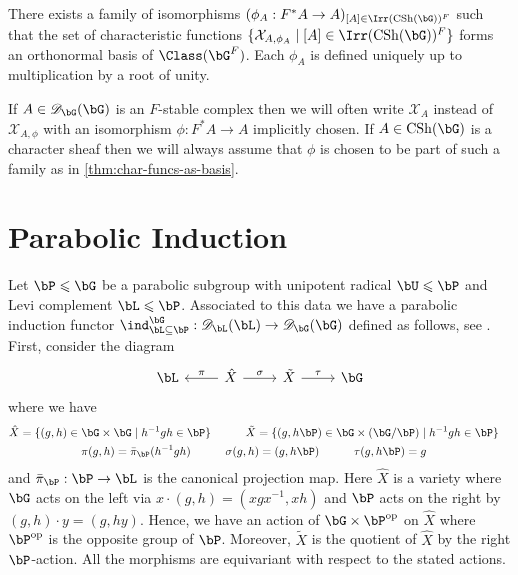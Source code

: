 \documentclass[eqthmnum,nocolour,skinny]{jt-calcs}
\DeclareMathOperator{\CS}{CSh}
\begin{document}
\begin{thm}[Lusztig]\label{thm:char-funcs-as-basis}
There exists a family of isomorphisms $(\phi_A : F^*A \to A)_{[A] \in \Irr(\CS(\bG))^F}$ such that the set of characteristic functions $\{\mathcal{X}_{A,\phi_A} \mid [A] \in \Irr(\CS(\bG))^F\}$ forms an orthonormal basis of $\Class(\bG^F)$. Each $\phi_A$ is defined uniquely up to multiplication by a root of unity.
\end{thm}

\begin{rem}
If $A \in \mathscr{D}_{\bG}(\bG)$ is an $F$-stable complex then we will often write $\mathcal{X}_A$ instead of $\mathcal{X}_{A,\phi}$ with an isomorphism $\phi : F^*A \to A$ implicitly chosen. If $A \in \CS(\bG)$ is a character sheaf then we will always assume that $\phi$ is chosen to be part of such a family as in \cref{thm:char-funcs-as-basis}.
\end{rem}

\section{Parabolic Induction}\label{sec:parabolic-ind-char-sheaves}
\begin{pa}\label{pa:ind-char-sheaves}
Let $\bP \leqslant \bG$ be a parabolic subgroup with unipotent radical $\bU \leqslant \bP$ and Levi complement $\bL \leqslant \bP$. Associated to this data we have a parabolic induction functor $\ind_{\bL \subseteq \bP}^{\bG} : \mathscr{D}_{\bL}(\bL) \to \mathscr{D}_{\bG}(\bG)$ defined as follows, see \cite[\S4.1]{lusztig:1985:character-sheaves}. First, consider the diagram
\begin{equation*}
\begin{tikzcd}
\bL & \hat{X} \arrow{l}[swap]{\pi}\arrow{r}{\sigma} & \tilde{X} \arrow{r}{\tau} & \bG
\end{tikzcd}
\end{equation*}
where we have
\begin{gather*}
\begin{aligned}
\hat{X} &= \{(g,h) \in \bG \times \bG \mid h^{-1}gh \in \bP\} \quad&\quad \tilde{X} &= \{(g,h\bP) \in \bG \times (\bG/\bP) \mid h^{-1}gh \in \bP\}
\end{aligned}\\
\begin{aligned}
\pi(g,h) &= \bar{\pi}_{\bP}(h^{-1}gh) \quad&\quad \sigma(g,h) &= (g,h\bP) \quad&\quad \tau(g,h\bP) &=g
\end{aligned}
\end{gather*}
and $\bar{\pi}_{\bP} : \bP \to \bL$ is the canonical projection map. Here $\hat{X}$ is a variety where $\bG$ acts on the left via $x\cdot (g,h) = (xgx^{-1},xh)$ and $\bP$ acts on the right by $(g,h)\cdot y = (g,hy)$. Hence, we have an action of $\bG\times\bP^{\mathrm{op}}$ on $\hat{X}$ where $\bP^{\mathrm{op}}$ is the opposite group of $\bP$. Moreover, $\tilde{X}$ is the quotient of $\hat{X}$ by the right $\bP$-action. All the morphisms are equivariant with respect to the stated actions.
\end{pa}
\end{document}
